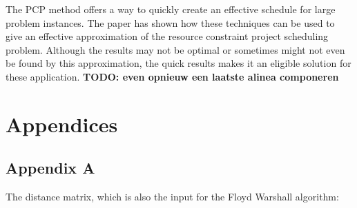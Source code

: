 \documentclass{article}
\theoremstyle{definition}
\newcommand{\TODO}[1]{{\color{red}\textbf{TODO: #1}}}
\begin{document}
The PCP method offers a way to quickly create an effective schedule for large problem instances. 
The paper has shown how these techniques can be used to give an effective approximation of the resource constraint project scheduling problem.
Although the results may not be optimal or sometimes might not even be found by this approximation, the quick results makes it an eligible solution for these application. \TODO{even opnieuw een laatste alinea componeren}

\newpage



\section{Appendices}

\subsection{Appendix A}
\label{appendix:a}
\label{text:appendix}
The distance matrix, which is also the input for the Floyd Warshall algorithm:\\
\end{document}
